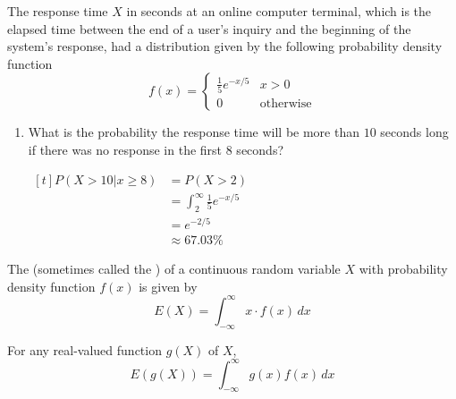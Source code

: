 \begin{example}[MMSA Ex. 4.30]
    The response time $X$ in seconds at an online computer terminal, which is the elapsed time between the end of a user's inquiry and the beginning of the system's response, had a distribution given by the following probability density function $$f(x) = \begin{cases} \frac{1}{5}e^{-x/5} & x > 0 \\ 0 & \text{otherwise} \end{cases}$$

    \begin{center}
    \end{center}

    \begin{enumerate}[label=\alph*)]
        \item What is the probability the response time will be more than $10$ seconds long if there was no response in the first $8$ seconds?

        $\begin{aligned}[t]
            P(X > 10 | x \ge 8) & = P(X > 2)                           \\ 
                                & = \int_2^\infty \frac{1}{5} e^{-x/5} \\
                                & = e^{-2/5}                           \\
                                & \approx 67.03 \%
        \end{aligned}$
    \end{enumerate}
\end{example}

\begin{definition}
    The  (sometimes called the ) of a continuous random variable $X$ with probability density function $f(x)$ is given by $$E(X) = \int_{-\infty}^\infty x \cdot f(x) \,dx$$ 

    For any real-valued function $g(X)$ of $X$, $$E(g(X)) = \int_{-\infty}^\infty g(x) f(x) \,dx$$
\end{definition}

